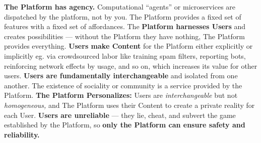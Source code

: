 \documentclass{article}
\begin{document}
\textbf{The Platform has agency.} Computational ``agents'' or
microservices are dispatched by the platform, not by you. The Platform
provides a fixed set of features with a fixed set of affordances. The
\textbf{Platform harnesses Users} and creates possibilities --- without the Platform they have
nothing, The Platform provides everything. \textbf{Users make Content}
for the Platform either explicitly or implicitly eg. via crowdsourced
labor like training spam filters, reporting bots, reinforcing network
effects by usage, and so on, which increases its value for other users.
\textbf{Users are fundamentally interchangeable} and isolated from one
another. The existence of sociality or community is a service provided
by the Platform. \textbf{The Platform Personalizes:} Users are
\emph{interchangeable} but not \emph{homogeneous,} and The Platform uses
their Content to create a private reality for each User. \textbf{Users
are unreliable} --- they lie, cheat, and subvert the game established by
the Platform, so \textbf{only the Platform can ensure safety and
reliability.}
\end{document}
